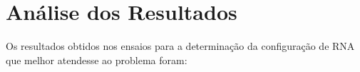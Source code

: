 \localtableofcontents* 

\section{Análise dos Resultados}

Os resultados obtidos nos ensaios para a determinação da configuração de RNA que melhor atendesse ao problema foram:
